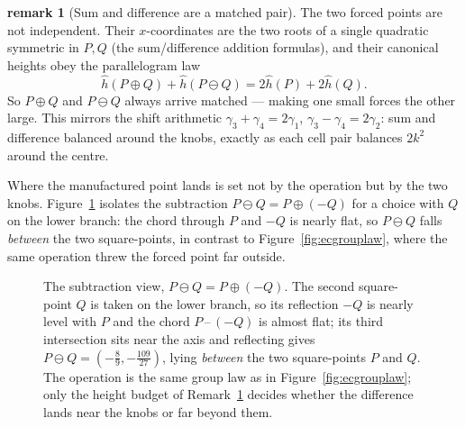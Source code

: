 \documentclass[11pt]{article}
\theoremstyle{definition}
\newtheorem{remark}{remark}
\begin{document}
\begin{remark}[Sum and difference are a matched pair]\label{rem:paralaw}
The two forced points are not independent. Their $x$-coordinates are the two roots
of a single quadratic symmetric in $P,Q$ (the sum/difference addition formulas), and
their canonical heights obey the parallelogram law
\[
  \hat h(P\oplus Q)+\hat h(P\ominus Q)=2\hat h(P)+2\hat h(Q).
\]
So $P\oplus Q$ and $P\ominus Q$ always arrive matched --- making one small forces
the other large. This mirrors the shift arithmetic
$\gamma_3+\gamma_4=2\gamma_1$, $\gamma_3-\gamma_4=2\gamma_2$: sum and difference
balanced around the knobs, exactly as each cell pair balances $2k^{2}$ around the
centre.
\end{remark}

\noindent Where the manufactured point lands is set not by the operation but by the
two knobs. Figure~\ref{fig:ecminus} isolates the subtraction
$P\ominus Q=P\oplus(-Q)$ for a choice with $Q$ on the lower branch: the chord
through $P$ and $-Q$ is nearly flat, so $P\ominus Q$ falls \emph{between} the two
square-points, in contrast to Figure~\ref{fig:ecgrouplaw}, where the same operation
threw the forced point far outside.

\begin{figure}[htbp]
\centering
{}
\caption{The subtraction view, $P\ominus Q=P\oplus(-Q)$. The second square-point
$Q$ is taken on the lower branch, so its reflection $-Q$ is nearly level with $P$
and the chord $P\,\text{--}\,(-Q)$ is almost flat; its third intersection sits near
the axis and reflecting gives $P\ominus Q=(-\tfrac89,-\tfrac{109}{27})$, lying
\emph{between} the two square-points $P$ and $Q$. The operation is the same group
law as in Figure~\ref{fig:ecgrouplaw}; only the height budget of
Remark~\ref{rem:paralaw} decides whether the difference lands near the knobs or far
beyond them.}
\label{fig:ecminus}
\end{figure}
\end{document}
